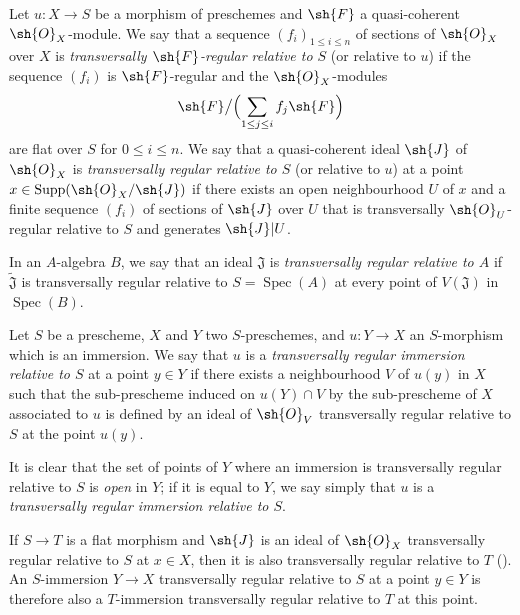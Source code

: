 
\begin{definition}[19.2.1]
\label{IV.19.2.1}
Let $u:X\to S$ be a morphism of preschemes and $\sh{F}$ a quasi-coherent $\sh{O}_X$-module.
We say that a sequence $(f_i)_{1\leq i\leq n}$ of sections of $\sh{O}_X$ over $X$ is \emph{transversally $\sh{F}$-regular relative to $S$} (or relative to $u$) if the sequence $(f_i)$ is $\sh{F}$-regular and the $\sh{O}_X$-modules
\[
  \sh{F}\big/\Bigl(\sum_{1\leq j\leq i}f_j\sh{F}\Bigr)
\]
are flat over $S$ for $0\leq i\leq n$.
We say that a quasi-coherent ideal $\sh{J}$ of $\sh{O}_X$ is \emph{transversally regular relative to $S$} (or relative to $u$) at a point $x\in\operatorname{Supp}(\sh{O}_X/\sh{J})$ if there exists an open neighbourhood $U$ of $x$ and a finite sequence $(f_i)$ of sections of $\sh{J}$ over $U$ that is transversally $\sh{O}_U$-regular relative to $S$ and generates $\sh{J}|U$.

In an $A$-algebra $B$, we say that an ideal $\mathfrak{J}$ is \emph{transversally regular relative to $A$} if $\widetilde{\mathfrak{J}}$ is transversally regular relative to $S=\operatorname{Spec}(A)$ at every point of $V(\mathfrak{J})$ in $\operatorname{Spec}(B)$.
\end{definition}

\begin{definition}[19.2.2]
\label{IV.19.2.2}
Let $S$ be a prescheme, $X$ and $Y$ two $S$-preschemes, and $u:Y\to X$ an $S$-morphism which is an immersion.
We say that $u$ is a \emph{transversally regular immersion relative to $S$} at a point $y\in Y$ if there exists a neighbourhood $V$ of $u(y)$ in $X$ such that the sub-prescheme induced on $u(Y)\cap V$ by the sub-prescheme of $X$ associated to $u$ is defined by an ideal of $\sh{O}_V$ transversally regular relative to $S$ at the point $u(y)$.

It is clear that the set of points of $Y$ where an immersion is transversally regular relative to $S$ is \emph{open} in $Y$; if it is equal to $Y$, we say simply that $u$ is a \emph{transversally regular immersion relative to $S$}.

If $S\to T$ is a flat morphism and $\sh{J}$ is an ideal of $\sh{O}_X$ transversally regular relative to $S$ at $x\in X$, then it is also transversally regular relative to $T$ ().
An $S$-immersion $Y\to X$ transversally regular relative to $S$ at a point $y\in Y$ is therefore also a $T$-immersion transversally regular relative to $T$ at this point.
\end{definition}

